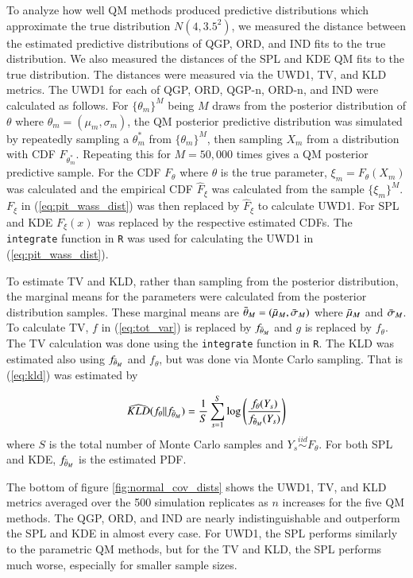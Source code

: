 \documentclass[preprint,12pt,authoryear]{elsarticle}
\newcommand{\1}[1]{\mathds{1}\left[#1\right]}
\begin{document}
To analyze how well QM methods produced predictive distributions which 
approximate the true distribution $N(4, 3.5^2)$, we measured the distance 
between the estimated predictive distributions of QGP, ORD, and IND fits to 
the true distribution. 
We also measured the distances of the SPL and KDE QM fits to the true 
distribution. The distances were measured via the UWD1, TV, and KLD metrics. 
The UWD1 for each of QGP, ORD, QGP-n, ORD-n, and IND were calculated as 
follows. For $\{\theta_m\}^M$ being $M$ draws from the posterior distribution
of $\theta$ where $\theta_m = (\mu_m, \sigma_m)$, the QM posterior predictive 
distribution was simulated by repeatedly sampling a $\theta_m^*$ from 
$\{\theta_m\}^M$, then sampling 
$X_m$ from a distribution with CDF $F_{\theta_m^*}$. Repeating this for 
$M = 50,000$ times gives a QM posterior predictive sample. For the CDF 
$F_{\theta}$ where $\theta$ is the true parameter, $\xi_m = F_{\theta}(X_m)$ 
was calculated and the empirical CDF $\hat{F}_{\xi}$ was calculated from the 
sample $\{\xi_m\}^M$. $F_{\xi}$ in (\ref{eq:pit_wass_dist}) was then replaced 
by $\hat{F}_{\xi}$ to calculate UWD1. For SPL and KDE $F_{\xi}(x)$ was replaced 
by the respective estimated CDFs. The \texttt{integrate} function in \texttt{R} 
was used for calculating the UWD1 in (\ref{eq:pit_wass_dist}).

To estimate TV and KLD, rather than sampling from the posterior distribution, 
the marginal means for the parameters were calculated from the posterior 
distribution samples. These marginal means  are 
$\Bar{\theta}_M = (\Bar{\mu}_M, \Bar{\sigma}_M)$ where $\Bar{\mu}_M$ and 
$\Bar{\sigma}_M$. To calculate TV, 
$f$ in (\ref{eq:tot_var}) is replaced by $f_{\Bar{\theta}_M}$ and $g$ is 
replaced by $f_{\theta}$. The TV calculation was done using the 
\texttt{integrate} function in \texttt{R}. The KLD was estimated also using 
$f_{\Bar{\theta}_M}$ and $f_{\theta}$, but was done via Monte Carlo sampling. 
That is (\ref{eq:kld}) was estimated by

\[
    \widehat{KLD}(f_{\theta} || f_{\Bar{\theta}_M}) = 
    \frac{1}{S}\sum_{s = 1}^S \text{log} 
    \left(\frac{f_{\theta}(Y_s)}{f_{\Bar{\theta}_M}(Y_s)}\right)
\]
where $S$ is the total number of Monte Carlo samples and
$Y_s \overset{iid}{\sim} F_{\theta}$. For both SPL and KDE, 
$f_{\Bar{\theta}_M}$ is the estimated PDF.


The bottom of figure \ref{fig:normal_cov_dists} shows the UWD1, TV, and 
KLD metrics averaged over the 500 simulation replicates as $n$ increases for 
the five QM methods. The QGP, ORD, and IND are nearly indistinguishable and 
outperform the SPL and KDE in almost every case. 
For UWD1, the SPL performs similarly to the parametric QM methods, but for the 
TV and KLD, the SPL performs much worse, especially for smaller sample sizes. 
\end{document}
